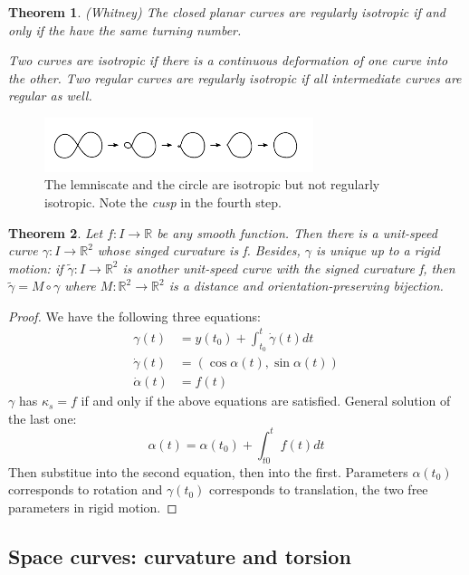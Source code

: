 \documentclass[a4paper,11pt,notitlepage,fullpage]{paper}
\newcommand{\y}{\gamma}
\newcommand{\dy}{\dot\gamma}
\theoremstyle{plain}
\newtheorem{thm}{Theorem}[section] %
\theoremstyle{definition}
\begin{document}
\begin{thm}
(Whitney) The closed planar curves are regularly isotropic if and only if the have the same turning number.

Two curves are \emph{isotropic} if there is a continuous deformation of one curve into the other. Two regular curves are \emph{regularly isotropic} if all intermediate curves are regular as well.
\end{thm}


\begin{figure}[H]
\centering
\includegraphics[width = 0.7\textwidth]{img/lemniscate-to-circle}
\caption{The lemniscate and the circle are isotropic but not regularly isotropic. Note the  \emph{cusp} in the fourth step.}
\label{fig:lemniscate-to-circle}
\end{figure}


\begin{thm}
Let $f: I \to \mathbb R$ be any smooth function. Then there is a unit-speed curve $\gamma: I \to \mathbb R^2$ whose singed curvature is f. Besides, $\gamma$ is unique up to a rigid motion: if $\tilde\gamma : I \to \mathbb R^2$ is another unit-speed curve with the signed curvature f, then $\tilde\gamma = M \circ \gamma$ where $M: \mathbb R^2 \to \mathbb R^2$ is a distance and orientation-preserving bijection.
\end{thm}

\begin{proof}
We have the following three equations:
\begin{align*}
\y(t) &= y(t_0) + \int_{t_0}^t \dy(t) dt\\
\dy(t) &= (\cos\alpha(t), \sin\alpha(t))\\
\dot\alpha(t) &= f(t)
\end{align*}
$\y$ has $\kappa_s = f$ if and only if the above equations are satisfied. General solution of the last one:
\[\alpha(t) = \alpha(t_0) + \int_{t0}^t f(t) dt\]
Then substitue into the second equation, then into the first. Parameters $\alpha(t_0)$ corresponds to rotation and $\y(t_0)$ corresponds to translation, the two free parameters in rigid motion.
\end{proof}

\subsection{Space curves: curvature and torsion}
\end{document}
